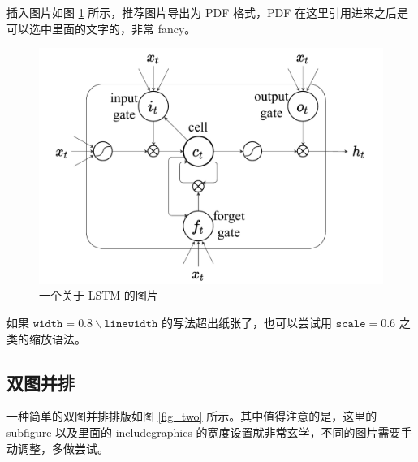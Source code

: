 \documentclass[12]{ctexart}
\begin{document}
插入图片如图 \ref{fig_lstm} 所示，推荐图片导出为 PDF 格式，PDF 在这里引用进来之后是可以选中里面的文字的，非常 fancy。

\begin{figure}[h!tbp]
    \centering
    \includegraphics[width=0.8\linewidth]{imgs/lstmCell.pdf}
    \caption{一个关于 LSTM 的图片}
    \label{fig_lstm}
\end{figure}

如果 $\mathtt{width=0.8 \backslash linewidth}$ 的写法超出纸张了，也可以尝试用 $\mathtt{scale=0.6}$ 之类的缩放语法。

\subsection{双图并排}

一种简单的双图并排排版如图 \ref{fig_two} 所示。其中值得注意的是，这里的 subfigure 以及里面的 includegraphics 的宽度设置就非常玄学，不同的图片需要手动调整，多做尝试。
\end{document}
